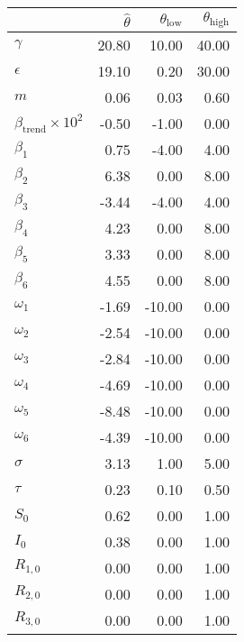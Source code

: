 \begin{tabular}{lrrr}
  \hline
 & \rule[-1.5mm]{0mm}{6mm}$\hat\theta$ & $\theta_{\mathrm{low}}$ & $\theta_{\mathrm{high}}$ \\ 
  \hline
$\gamma$ & 20.80 & 10.00 & 40.00 \\ 
  $\epsilon$ & 19.10 & 0.20 & 30.00 \\ 
  $m$ & 0.06 & 0.03 & 0.60 \\ 
  $\beta_{\mathrm{trend}}\times 10^2$ & -0.50 & -1.00 & 0.00 \\ 
  $\beta_1$ & 0.75 & -4.00 & 4.00 \\ 
  $\beta_2$ & 6.38 & 0.00 & 8.00 \\ 
  $\beta_3$ & -3.44 & -4.00 & 4.00 \\ 
  $\beta_4$ & 4.23 & 0.00 & 8.00 \\ 
  $\beta_5$ & 3.33 & 0.00 & 8.00 \\ 
  $\beta_6$ & 4.55 & 0.00 & 8.00 \\ 
  $\omega_1$ & -1.69 & -10.00 & 0.00 \\ 
  $\omega_2$ & -2.54 & -10.00 & 0.00 \\ 
  $\omega_3$ & -2.84 & -10.00 & 0.00 \\ 
  $\omega_4$ & -4.69 & -10.00 & 0.00 \\ 
  $\omega_5$ & -8.48 & -10.00 & 0.00 \\ 
  $\omega_6$ & -4.39 & -10.00 & 0.00 \\ 
  $\sigma$ & 3.13 & 1.00 & 5.00 \\ 
  $\tau$ & 0.23 & 0.10 & 0.50 \\ 
  $S_0$ & 0.62 & 0.00 & 1.00 \\ 
  $I_0$ & 0.38 & 0.00 & 1.00 \\ 
  $R_{1,0}$ & 0.00 & 0.00 & 1.00 \\ 
  $R_{2,0}$ & 0.00 & 0.00 & 1.00 \\ 
  $R_{3,0}$ & 0.00 & 0.00 & 1.00 \\ 
   \hline
\end{tabular}
